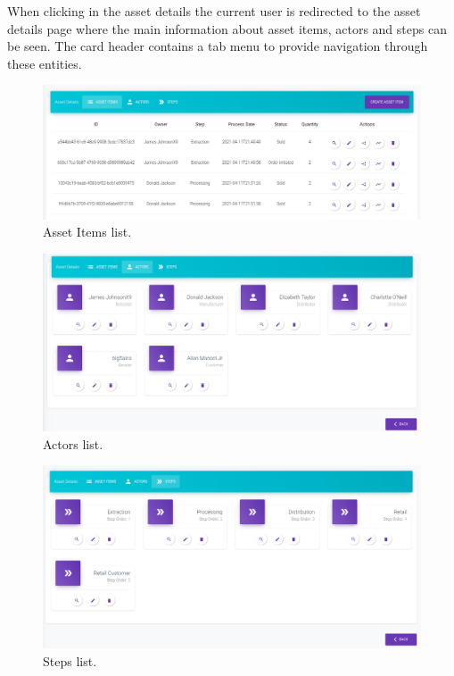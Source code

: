 When clicking in the asset details the current user is redirected to the asset details page where the main information about asset items, actors and steps can be seen. The card header contains a tab menu to provide navigation through these entities. 

\begin{figure}[H]
\begin{center}
  \includegraphics[scale=0.35]{images/use_example/06_asset_Item_list.png}
\caption{Asset Items list.}
\label{fig:asset_item_list}
\end{center}
\end{figure}

\begin{figure}[H]
\begin{center}
  \includegraphics[scale=0.34]{images/use_example/07_actor_list.png}
\caption{Actors list.}
\label{fig:actor_list}
\end{center}
\end{figure}

\begin{figure}[H]
\begin{center}
  \includegraphics[scale=0.34]{images/use_example/08_steps_list.png}
\caption{Steps list.}
\label{fig:step_list}
\end{center}
\end{figure}

